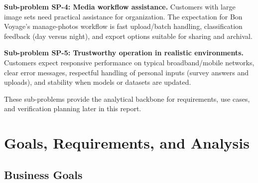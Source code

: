 \documentclass[12pt,oneside,openany]{report}
\begin{document}
\textbf{Sub-problem SP-4: Media workflow assistance.} Customers with large image sets need practical assistance for organization. The expectation for Bon Voyage's manage-photos workflow is fast upload/batch handling, classification feedback (day versus night), and export options suitable for sharing and archival.

\textbf{Sub-problem SP-5: Trustworthy operation in realistic environments.} Customers expect responsive performance on typical broadband/mobile networks, clear error messages, respectful handling of personal inputs (survey answers and uploads), and stability when models or datasets are updated.

These sub-problems provide the analytical backbone for requirements, use cases, and verification planning later in this report.

\chapter{Goals, Requirements, and Analysis}\label{ch:goals}

\section{Business Goals}
\end{document}
